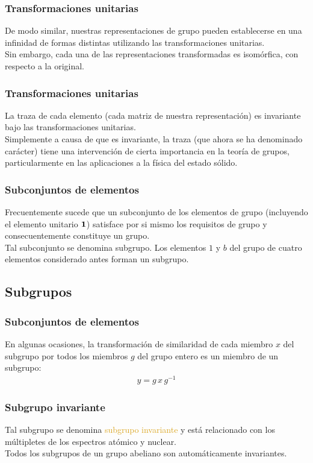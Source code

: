 \documentclass[12pt]{beamer}
\begin{document}
\begin{frame}
\frametitle{Transformaciones unitarias}
De modo similar, nuestras re­presentaciones de grupo pueden establecerse en una infinidad de formas distintas utilizando las transformaciones unitarias.
\\
\bigskip
\pause
Sin embargo, cada una de las representaciones transformadas es isomórfica, con respecto a la original.
\end{frame}
\begin{frame}
\frametitle{Transformaciones unitarias}
La traza de cada elemento (cada matriz de nuestra representación) es invariante bajo las transformaciones unitarias.
\\
\bigskip
\pause
Simplemente a causa de que es invariante, la traza (que ahora se ha denominado \textcolor{candypink}{carácter}) tiene una intervención de cierta importancia en la teoría de grupos, particularmente en las aplicaciones a la física del estado sólido.
\end{frame}
\begin{frame}
\frametitle{Subconjuntos de elementos}
Frecuentemente sucede que un subconjunto de los elementos de grupo (incluyendo el elemento unitario $\vb{1}$) satisface por si mismo los requisitos de grupo y consecuentemente constituye un grupo.
\\
\bigskip
\pause
Tal subconjunto se denomina \textcolor{cadmiumred}{subgrupo}. \pause Los elementos $1$ y $b$ del grupo de cuatro elementos considerado antes forman un subgrupo.
\end{frame}

\subsection{Subgrupos}

\begin{frame}
\frametitle{Subconjuntos de elementos}
En algunas ocasiones, la transformación de similaridad de cada miembro $x$ del subgrupo por todos los miembros $g$ del grupo entero es un miembro de un subgrupo:
\pause
\begin{align}
y = g \, x \, g^{-1}
\label{eq:ecuacion_04_189}
\end{align}
\end{frame}
\begin{frame}
\frametitle{Subgrupo invariante}
Tal subgrupo se denomina \textcolor{goldenrod}{subgrupo invariante} y está relacionado con los múltipletes de los espectros atómico y nuclear. 
\\
\bigskip
\pause
Todos los subgrupos de un grupo abeliano son automáticamente invariantes.
\end{frame}
\end{document}
